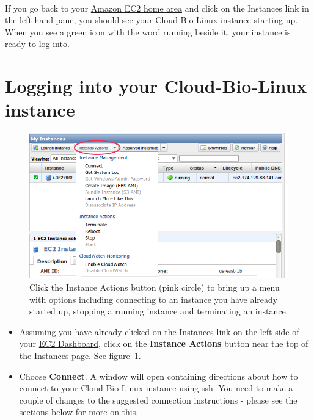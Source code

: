 \paragraph{}If you go back to your \href{http://console.aws.amazon.com/ec2/home}{Amazon EC2 home area} and click on the Instances link in the left hand pane, you should see your Cloud-Bio-Linux instance starting up. When you see a green icon with the word running beside it, your instance is ready to log into.

\section{Logging into your Cloud-Bio-Linux instance}


\begin{figure}[!hd]
	\fbox
	{
		\begin{minipage}{13cm}
\includegraphics[width=\maxwidth]{"images/instancesOptions"}
\caption[Start an Instance]{\label{fig:instancesOptions}Click the Instance Actions button (pink circle) to bring up a menu with options including connecting to an instance you have already started up, stopping a running instance and terminating an instance.}
		\end{minipage}
	}
\end{figure}


\begin{itemize}
\item Assuming you have already clicked on the Instances link on the left side of your \href{https://console.aws.amazon.com/ec2/home}{EC2 Dashboard}, click on the \textbf{Instance Actions} button near the top of the Instances page. See figure~\ref{fig:instancesOptions}.
\item Choose \textbf{Connect}. A window will open containing directions about how to connect to your Cloud-Bio-Linux instance using ssh. You need to make a couple of changes to the suggested connection instructions - please see the sections below for more on this.
\end{itemize}

